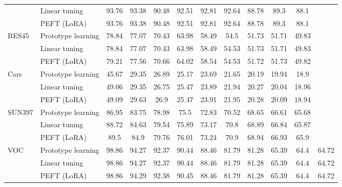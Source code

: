 \begin{tabular}{l l cccccccccc}
 & Linear tuning & 93.76 & 93.38 & 90.48 & 92.51 & 92.81 & 92.64 & 88.78 & 89.3 & 88.1 \\
 & PEFT (LoRA) & 93.76 & 93.38 & 90.48 & 92.51 & 92.81 & 92.64 & 88.78 & 89.3 & 88.1 \\
\midrule
\multirow{3}{*}{RES45} & Prototype learning & 78.84 & 77.07 & 70.43 & 63.98 & 58.49 & 54.5 & 51.73 & 51.71 & 49.83 \\
 & Linear tuning & 78.84 & 77.07 & 70.43 & 63.98 & 58.49 & 54.53 & 51.73 & 51.71 & 49.83 \\
 & PEFT (LoRA) & 79.21 & 77.56 & 70.66 & 64.02 & 58.54 & 54.53 & 51.72 & 51.73 & 49.82 \\
\midrule
\multirow{3}{*}{Cars} & Prototype learning & 45.67 & 29.35 & 26.89 & 25.17 & 23.69 & 21.65 & 20.19 & 19.94 & 18.9 \\
 & Linear tuning & 49.06 & 29.35 & 26.75 & 25.47 & 23.89 & 21.94 & 20.27 & 20.04 & 18.96 \\
 & PEFT (LoRA) & 49.09 & 29.63 & 26.9 & 25.47 & 23.91 & 21.95 & 20.28 & 20.09 & 18.94 \\
\midrule
\multirow{3}{*}{SUN397} & Prototype learning & 86.95 & 83.75 & 78.98 & 75.5 & 72.83 & 70.52 & 68.65 & 66.61 & 65.68 \\
 & Linear tuning & 88.72 & 84.63 & 79.54 & 75.89 & 73.17 & 70.8 & 68.89 & 66.84 & 65.87 \\
 & PEFT (LoRA) & 89.5 & 84.9 & 79.76 & 76.01 & 73.24 & 70.9 & 68.94 & 66.93 & 65.9 \\
\midrule
\multirow{3}{*}{VOC} & Prototype learning & 98.86 & 94.27 & 92.37 & 90.44 & 88.46 & 81.79 & 81.28 & 65.39 & 64.4 & 64.72 \\
 & Linear tuning & 98.86 & 94.27 & 92.37 & 90.44 & 88.46 & 81.79 & 81.28 & 65.39 & 64.4 & 64.72 \\
 & PEFT (LoRA) & 98.86 & 94.29 & 92.38 & 90.45 & 88.46 & 81.79 & 81.28 & 65.39 & 64.4 & 64.72 \\
\bottomrule
\end{tabular}
